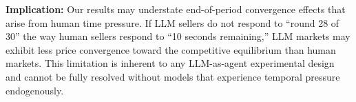 \documentclass[12pt]{article}
\begin{document}
\textbf{Implication:} Our results may understate end-of-period convergence effects that arise from human time pressure. If LLM sellers do not respond to ``round 28 of 30'' the way human sellers respond to ``10 seconds remaining,'' LLM markets may exhibit less price convergence toward the competitive equilibrium than human markets. This limitation is inherent to any LLM-as-agent experimental design and cannot be fully resolved without models that experience temporal pressure endogenously.
\end{document}
